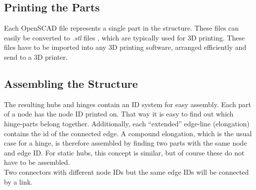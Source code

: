 \subsection{Printing the Parts}
Each OpenSCAD file represents a single part in the structure. These files can easily be converted to \textit{.stl} files , which are typically used for 3D printing. These files have to be imported into any 3D printing software, arranged efficiently and send to a 3D printer. 
\subsection{Assembling the Structure}
The resulting hubs and hinges contain an ID system for easy assembly. Each part of a node has the node ID printed on. That way it is easy to find out which hinge-parts belong together. Additionally, each ``extended'' edge-line (elongation)  contains the id of the connected edge. A compound elongation, which is the usual case for a hinge, is therefore assembled by finding two parts with the same node and edge ID. For static hubs, this concept is similar, but of course these do not have to be assembled.\\
Two connectors with different node IDs but the same edge IDs will be connected by a link.
